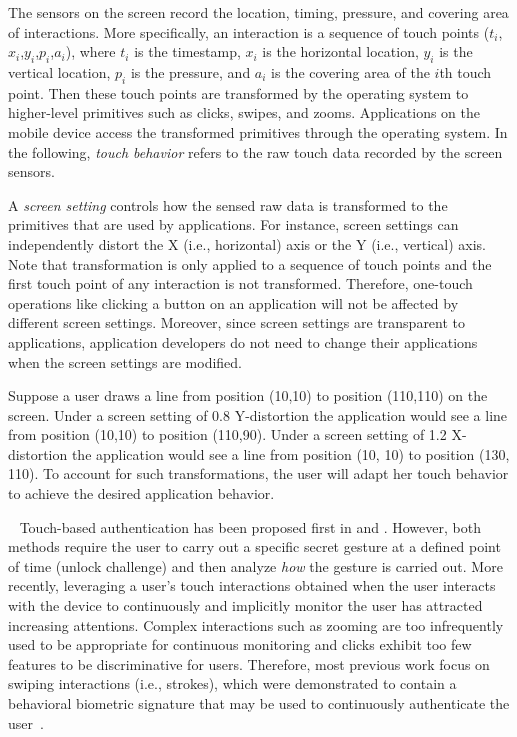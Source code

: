 \documentclass{sig-alternate-05-2015}
\newcommand{\myparatight}[1]{\smallskip\noindent{\bf {#1}:}~}
\begin{document}
The sensors on the screen record the location, timing, pressure, and covering
area of interactions.  More specifically, an interaction is a sequence of touch
points ($t_i$,$x_i$,$y_i$,$p_i$,$a_i$), where $t_i$ is the timestamp, $x_i$ is
the horizontal location, $y_i$ is the vertical location,  $p_i$ is the pressure,
and $a_i$ is the covering area  of the $i$th touch point.   Then these touch
points are transformed by the operating system to higher-level primitives such
as clicks, swipes, and zooms.  Applications on the mobile device access the
transformed primitives through the operating system.  In the following,
\emph{touch behavior} refers to the raw touch data recorded by the screen
sensors. 

A \emph{screen setting}  controls how the sensed raw data is transformed to the
primitives that are used by applications. For instance, screen settings can
independently distort the X (i.e., horizontal) axis or the Y (i.e., vertical)
axis. 
Note that  transformation is only applied to a sequence of touch points and the
first touch point of any interaction is not transformed. Therefore, one-touch
operations like clicking a button on an application will not be affected by
different screen settings.  Moreover, since screen settings are transparent to
applications, application developers do not need to change their applications
when the screen settings are modified.

Suppose a user draws a line from position (10,10) to position (110,110) on the
screen.  Under a screen setting of 0.8 Y-distortion the application would see a
line from position (10,10) to position (110,90). Under a screen setting of 1.2
X-distortion the application would see a line from position (10, 10) to position
(130, 110). To account for such transformations, the user will adapt her touch
behavior  to achieve the desired application behavior.


\myparatight{Touch-based continuous authentication}  Touch-based authentication
has been proposed first in \cite{munichGuys} and
\cite{Sae-Bae:2012:BGN:2207676.2208543}. However, both methods require the user
to carry out a specific secret gesture at a defined point of time (unlock
challenge) and then analyze \emph{how} the gesture is carried out. More
recently,  leveraging  a user's  touch interactions obtained when the user
interacts with the device to continuously and implicitly monitor the user has
attracted increasing attentions. 
Complex interactions such as zooming are too infrequently used to be appropriate
for continuous monitoring and clicks exhibit too few  features to be
discriminative for users. 
Therefore, most previous work focus on  swiping interactions (i.e., strokes),
which were demonstrated to contain a behavioral biometric signature that may be
used to continuously authenticate the user~\cite{bo2013silentsense,
frank2013touchalytics, li2013unobservable, sae2012investigating,
sherman2014user}. 
\end{document}
